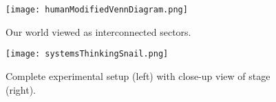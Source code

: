 
\begin{figure}[h]
	\centering
	\texttt{[image: humanModifiedVennDiagram.png]}
	\caption{Our world viewed as interconnected sectors.}
	\label{fig:humanModifiedVennDiagram}
\end{figure}

\begin{figure}[h]
	\centering
	\texttt{[image: systemsThinkingSnail.png]}
	\caption{Complete experimental setup (left) with close-up view of stage (right).}
	\label{fig:systemsThinkingSnail}
\end{figure}